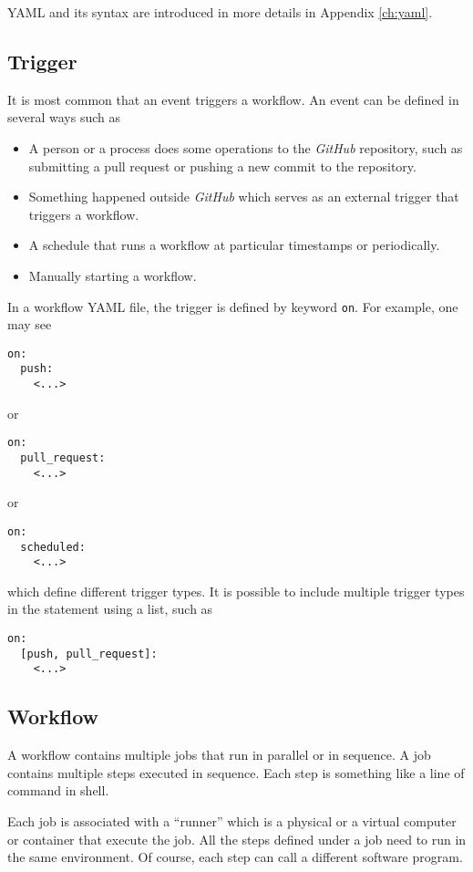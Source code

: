 YAML and its syntax are introduced in more details in Appendix \ref{ch:yaml}.

\subsection{Trigger}

It is most common that an event triggers a workflow. An event can be defined in several ways such as
\begin{itemize}
	\item A person or a process does some operations to the \textit{GitHub} repository, such as submitting a pull request or pushing a new commit to the repository.
	\item Something happened outside \textit{GitHub} which serves as an external trigger that triggers a workflow.
	\item A schedule that runs a workflow at particular timestamps or periodically.
	\item Manually starting a workflow.
\end{itemize}

In a workflow YAML file, the trigger is defined by keyword \verb|on|. For example, one may see
\begin{lstlisting}
on:
  push:
    <...>	
\end{lstlisting}
or
\begin{lstlisting}
on:
  pull_request:
    <...>	
\end{lstlisting}
or
\begin{lstlisting}
on:
  scheduled:
    <...>	
\end{lstlisting}
which define different trigger types. It is possible to include multiple trigger types in the statement using a list, such as
\begin{lstlisting}
on:
  [push, pull_request]:
    <...>	
\end{lstlisting}

\subsection{Workflow}

A workflow contains multiple jobs that run in parallel or in sequence. A job contains multiple steps executed in sequence. Each step is something like a line of command in shell.

Each job is associated with a ``runner'' which is a physical or a virtual computer or container that execute the job. All the steps defined under a job need to run in the same environment. Of course, each step can call a different software program.

